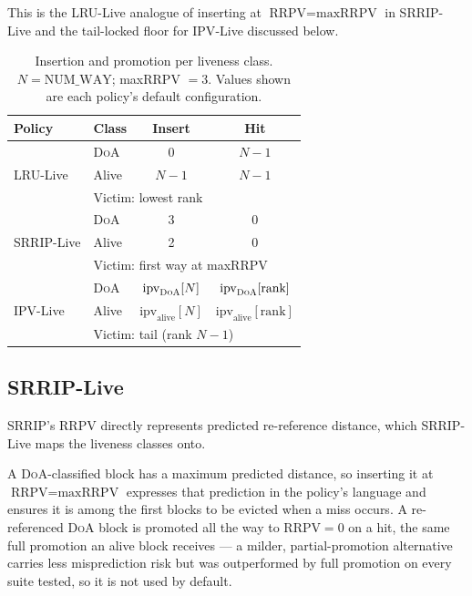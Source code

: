 \documentclass[conference]{IEEEtran}
\newcommand{\srrip}{\textsc{SRRIP}\xspace}
\newcommand{\ipv}{\textsc{IPV}\xspace}
\newcommand{\lru}{\textsc{LRU}\xspace}
\newcommand{\doa}{\textsc{DoA}\xspace}
\newcommand{\rrpv}{\textsc{RRPV}\xspace}
\begin{document}
This is the \lru-Live analogue of inserting at $\text{RRPV}=\text{maxRRPV}$ in
\srrip-Live and the tail-locked floor for \ipv-Live discussed below.
\begin{table}[h!]
\centering
\renewcommand{\arraystretch}{1.15}
\footnotesize
\caption{Insertion and promotion per liveness class. $N = \text{NUM\_WAY}$;
  maxRRPV $=3$. Values shown are each policy's default configuration.}
\label{tab:policy_actions}
\begin{tabular}{ll cc}
\toprule
Policy & Class & Insert & Hit \\
\midrule
\multirow{3}{*}{\lru-Live}
  & \doa  & $0$                           & $N{-}1$ \\
  & Alive & $N{-}1$                       & $N{-}1$ \\
  & \multicolumn{3}{l}{Victim: lowest rank} \\
\midrule
\multirow{3}{*}{\srrip-Live}
  & \doa  & 3 & 0 \\
  & Alive & 2 & 0 \\
  & \multicolumn{3}{l}{Victim: first way at maxRRPV} \\
\midrule
\multirow{3}{*}{\ipv-Live}
  & \doa  & $\text{ipv}_{\doa}[N]$        & $\text{ipv}_{\doa}[\text{rank}]$ \\
  & Alive & $\text{ipv}_{\text{alive}}[N]$ & $\text{ipv}_{\text{alive}}[\text{rank}]$ \\
  & \multicolumn{3}{l}{Victim: tail (rank $N{-}1$)} \\
\bottomrule
\end{tabular}
\end{table}


\subsection{SRRIP-Live}

\srrip's \rrpv directly represents predicted re-reference distance, which 
\srrip-Live maps the liveness classes onto.

A \doa-classified block has a maximum predicted distance, so inserting it
at $\text{RRPV}=\text{maxRRPV}$ expresses that prediction in the policy's
language and ensures it is among the first blocks to be evicted when a miss occurs.
A re-referenced \doa block is promoted all the way to $\text{RRPV}=0$ on a
hit, the same full promotion an alive block receives --- a milder,
partial-promotion alternative carries less misprediction risk but was
outperformed by full promotion on every suite tested, so it is not used by
default.
\end{document}
